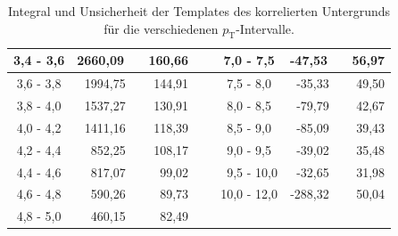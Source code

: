 \begin{table}[h]
\begin{tabular}{ | c || r | r ||  l  || c || r | r | }
		3,4 - 3,6 & 2660,09 \ & 160,66 \hspace{3mm} & \ &  7,0 - 7,5 & -47,53 \ & 56,97 \hspace{3mm} \\ \hline
		3,6 - 3,8 & 1994,75 \ & 144,91 \hspace{3mm} & \ &  7,5 - 8,0 & -35,33 \ & 49,50 \hspace{3mm} \\ \hline
		3,8 - 4,0 & 1537,27 \ & 130,91 \hspace{3mm} & \ &  8,0 - 8,5 & -79,79 \ & 42,67 \hspace{3mm} \\ \hline
		4,0 - 4,2 & 1411,16 \ & 118,39 \hspace{3mm} & \ &  8,5 - 9,0 & -85,09 \ & 39,43 \hspace{3mm} \\ \hline
		4,2 - 4,4 & 852,25 \  & 108,17 \hspace{3mm} & \ &  9,0 - 9,5 & -39,02 \ & 35,48 \hspace{3mm} \\ \hline
		4,4 - 4,6 & 817,07 \  & 99,02 \hspace{3mm} &  \ &  \ 9,5 - 10,0 & -32,65 \ & 31,98 \hspace{3mm} \\ \hline
		4,6 - 4,8 & 590,26 \  & 89,73 \hspace{3mm} &  \ &  10,0 - 12,0 & -288,32 \ & 50,04 \hspace{3mm} \\ \hline
		4,8 - 5,0 & 460,15 \  & 82,49 \hspace{3mm} &  \ & \   & \  & \  \\ \hline
	
\end{tabular}
	
\caption{Integral und Unsicherheit der Templates des korrelierten Untergrunds für die verschiedenen $p_\text{T}$-Intervalle.}
\label{tab:IntAndError}
\end{table}
\clearpage

